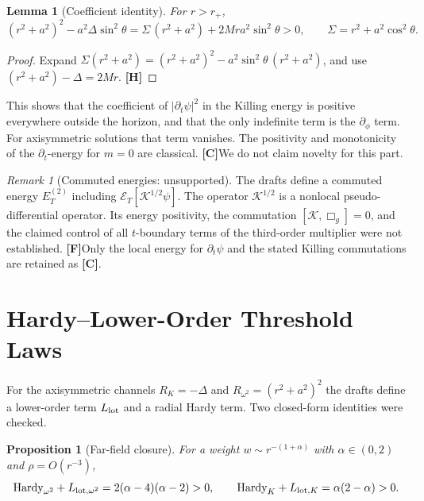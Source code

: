 \documentclass[11pt,a4paper]{article}
\newcommand{\VH}{\textcolor{vh}{\textbf{[H]}}}
\newcommand{\CC}{\textcolor{cc}{\textbf{[C]}}}
\newcommand{\FF}{\textcolor{ff}{\textbf{[F]}}}
\newtheorem{proposition}[theorem]{Proposition}
\newtheorem{lemma}[theorem]{Lemma}
\theoremstyle{remark}
\newtheorem{remark}[theorem]{Remark}
\theoremstyle{definition}
\begin{document}
\begin{lemma}[Coefficient identity]
\label{lem:energy}
For $r>r_+$,
\[
(r^2+a^2)^2 - a^2\Delta\sin^2\theta = \Sigma\,(r^2+a^2) + 2Mra^2\sin^2\theta > 0, \qquad \Sigma = r^2 + a^2\cos^2\theta.
\]
\end{lemma}

\begin{proof}
Expand $\Sigma(r^2+a^2) = (r^2+a^2)^2 - a^2\sin^2\theta\,(r^2+a^2)$, and use $(r^2+a^2) - \Delta = 2Mr$. \VH
\end{proof}

This shows that the coefficient of $|\partial_t\psi|^2$ in the Killing energy is positive everywhere outside the horizon, and that the only indefinite term is the $\partial_\phi$ term. For axisymmetric solutions that term vanishes. The positivity and monotonicity of the $\partial_t$-energy for $m=0$ are classical. \CC We do not claim novelty for this part.

\begin{remark}[Commuted energies: unsupported]
The drafts define a commuted energy $E^{(2)}_T$ including $\mathcal{E}_T[\mathcal{K}^{1/2}\psi]$. The operator $\mathcal{K}^{1/2}$ is a nonlocal pseudo-differential operator. Its energy positivity, the commutation $[\mathcal{K},\Box_g] = 0$, and the claimed control of all $t$-boundary terms of the third-order multiplier were not established. \FF Only the local energy for $\partial_t\psi$ and the stated Killing commutations are retained as \CC.
\end{remark}

\section{Hardy--Lower-Order Threshold Laws}
\label{sec:hardy}

For the axisymmetric channels $R_K = -\Delta$ and $R_{\omega^2} = (r^2+a^2)^2$ the drafts define a lower-order term $L_{\rm lot}$ and a radial Hardy term. Two closed-form identities were checked.

\begin{proposition}[Far-field closure]
\label{prop:far}
For a weight $w \sim r^{-(1+\alpha)}$ with $\alpha\in(0,2)$ and $\rho = O(r^{-3})$,
\[
\mathrm{Hardy}_{\omega^2} + L_{{\rm lot},\omega^2} = 2(\alpha-4)(\alpha-2) > 0, \qquad \mathrm{Hardy}_K + L_{{\rm lot},K} = \alpha(2-\alpha) > 0.
\]
\end{proposition}
\end{document}

